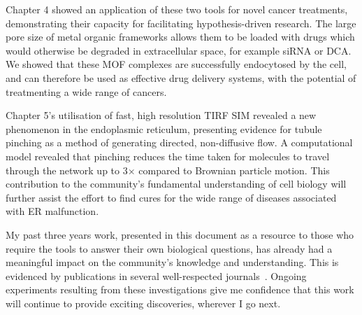 Chapter 4 showed an application of these two tools for novel cancer treatments, demonstrating their capacity for facilitating hypothesis-driven research. 
The large pore size of metal organic frameworks allows them to be loaded with drugs which would otherwise be degraded in extracellular space, for example siRNA or DCA. 
We showed that these MOF complexes are successfully endocytosed by the cell, and can therefore be used as effective drug delivery systems, with the potential of treatmenting a wide range of cancers. 

Chapter 5's utilisation of fast, high resolution TIRF SIM revealed a new phenomenon in the endoplasmic reticulum, presenting evidence for tubule pinching as a method of generating directed, non-diffusive flow. 
A computational model revealed that pinching reduces the time taken for molecules to travel through the network up to 3$\times$ compared to Brownian particle motion. 
This contribution to the community's fundamental understanding of cell biology will further assist the effort to find cures for the wide range of diseases associated with ER malfunction.

My past three years work, presented in this document as a resource to those who require the tools to answer their own biological questions, has already had a meaningful impact on the community's knowledge and understanding.
This is evidenced by publications in several well-respected journals~\cite{teplensky2017temperature, fantham2017new, holcman2018single, lautenschlager2018c, moghadam2018computer}. 
Ongoing experiments resulting from these investigations give me confidence that this work will continue to provide exciting discoveries, wherever I go next. 

%
